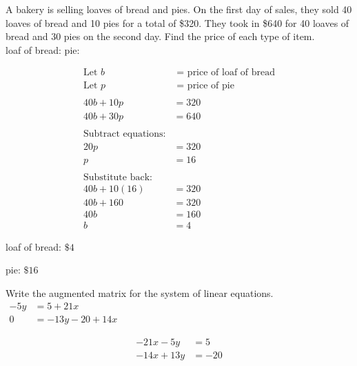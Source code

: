 \documentclass[addpoints]{exam}
\begin{document}
\begin{questions}
\begin{center}
\end{center}
\newpage

\question[6] A bakery is selling loaves of bread and pies. On the first day of sales, they sold 40 loaves of bread and 10 pies for a total of \$320. They took in \$640 for 40 loaves of bread and 30 pies on the second day. Find the price of each type of item.
\\
loaf of bread:\fillin {} pie:\fillin
\begin{solution}
\[\begin{aligned} \text{Let } b &\text{ = price of loaf of bread} \\ \text{Let } p &\text{ = price of pie} \\ \\ 40b + 10p &= 320 \\ 40b + 30p &= 640 \\ \\ \text{Subtract equations:} & \\ 20p &= 320 \\ p &= 16 \\ \\ \text{Substitute back:} & \\ 40b + 10(16) &= 320 \\ 40b + 160 &= 320 \\ 40b &= 160 \\ b &= 4 \end{aligned}\]

loaf of bread: \(\boxed{ \text{\$} 4 }\)

pie: \(\boxed{ \text{\$} 16 }\)
\end{solution}
\newpage

\question[4] Write the augmented matrix for the system of linear equations.\\
    
\(\displaystyle{ \begin{aligned} -5y &= 5 + 21x \\ 0 &= -13y - 20 + 14x \end{aligned} }\)
\begin{solution}
\[\begin{aligned} -21x - 5y &= 5 \\ -14x + 13y &= -20 \end{aligned}\]


\end{solution}
\end{questions}
\end{document}
